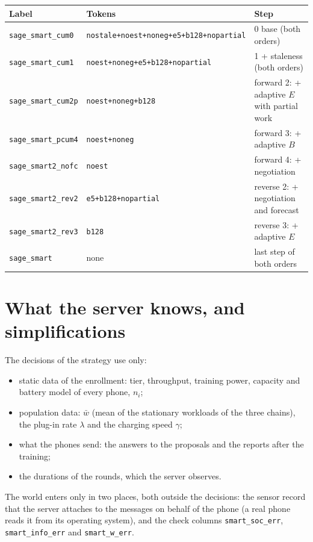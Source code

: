 \documentclass[11pt,a4paper]{article}
\newcommand{\cf}[1]{\texttt{#1}}
\begin{document}
\begin{table}[H]
  \centering
  \begin{tabular}{llp{}}
    \toprule
    Label & Tokens & Step \\
    \midrule
    \cf{sage\_smart\_cum0}   & \cf{nostale+noest+noneg+e5+b128+nopartial} & 0 base (both orders) \\
    \cf{sage\_smart\_cum1}   & \cf{noest+noneg+e5+b128+nopartial} & 1 + staleness (both orders) \\
    \cf{sage\_smart\_cum2p}  & \cf{noest+noneg+b128} & forward 2: + adaptive $E$ with partial work \\
    \cf{sage\_smart\_pcum4}  & \cf{noest+noneg} & forward 3: + adaptive $B$ \\
    \cf{sage\_smart2\_nofc}  & \cf{noest} & forward 4: + negotiation \\
    \cf{sage\_smart2\_rev2}  & \cf{e5+b128+nopartial} & reverse 2: + negotiation and forecast \\
    \cf{sage\_smart2\_rev3}  & \cf{b128} & reverse 3: + adaptive $E$ \\
    \cf{sage\_smart}         & none & last step of both orders \\
    \bottomrule
  \end{tabular}
\end{table}

\newpage
\section{What the server knows, and simplifications}
\label{sec:info}

The decisions of the strategy use only:
\begin{itemize}
  \item static data of the enrollment: tier, throughput, training power,
        capacity and battery model of every phone, $n_i$;
  \item population data: $\bar{w}$ (mean of the stationary workloads of the
        three chains), the plug-in rate $\lambda$ and the charging speed
        $\gamma$;
  \item what the phones send: the answers to the proposals and the reports
        after the training;
  \item the durations of the rounds, which the server observes.
\end{itemize}
The world enters only in two places, both outside the decisions: the sensor
record that the server attaches to the messages on behalf of the phone (a real
phone reads it from its operating system), and the check columns
\cf{smart\_soc\_err}, \cf{smart\_info\_err} and \cf{smart\_w\_err}.
\end{document}
